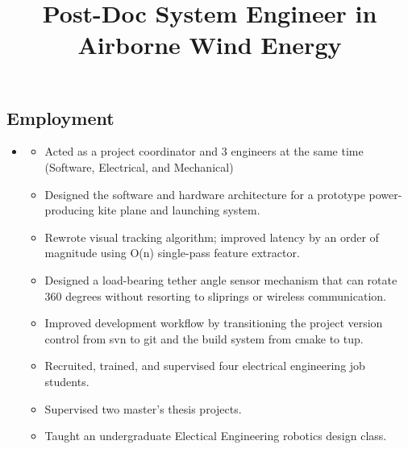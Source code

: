 \documentclass[line,lm,rm,11pt]{res} %
\def\spaceline{\vspace{1mm} \fullline}
\begin{document}
\begin{resume}
\section{Employment}
\begin{itemize}
\item
	\spaceline
	\title{\bf Post-Doc System Engineer in \\ Airborne Wind Energy }
	\begin{position}
	\vspace{-2mm}
	\begin{itemize}
		\item Acted as a project coordinator and 3 engineers at the same time (Software, Electrical, and Mechanical)
		\item Designed the software and hardware architecture for a prototype power-producing kite plane and launching system.
		\item Rewrote visual tracking algorithm; improved latency by an order of magnitude using O(n) single-pass feature extractor.
		\item Designed a load-bearing tether angle sensor mechanism that can rotate 360 degrees without resorting to sliprings or wireless communication.
		\item Improved development workflow by transitioning the project version control from svn to git and the build system from cmake to tup.
		\item Recruited, trained, and supervised four electrical engineering job students.
		\item Supervised two master's thesis projects.
		\item Taught an undergraduate Electical Engineering robotics design class.


\end{itemize}
\end{position}
\end{itemize}
\end{resume}
\end{document}
